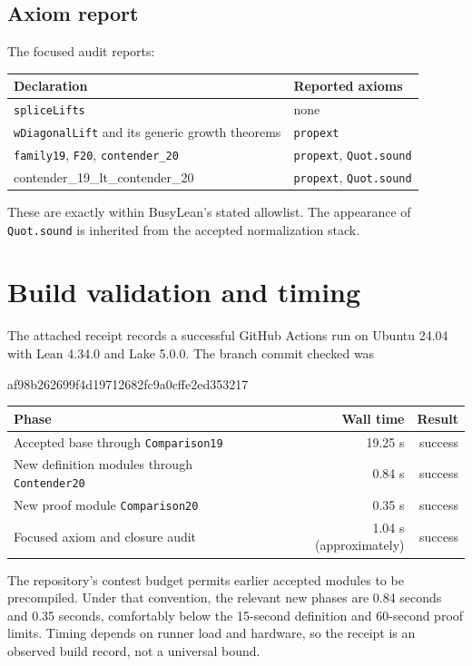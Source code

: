 \documentclass[11pt]{article}
\theoremstyle{definition}
\newcommand{\code}[1]{\texttt{#1}}
\begin{document}
\subsection{Axiom report}

The focused audit reports:
\begin{center}
\begin{tabularx}{0.93\textwidth}{@{}lX@{}}
\toprule
Declaration & Reported axioms \\
\midrule
\code{spliceLifts} & none \\
\code{wDiagonalLift} and its generic growth theorems & \code{propext} \\
\code{family19}, \code{F20}, \code{contender\_20} & \code{propext}, \code{Quot.sound} \\
contender\_19\_lt\_contender\_20 & \code{propext}, \code{Quot.sound} \\
\bottomrule
\end{tabularx}
\end{center}
These are exactly within BusyLean's stated allowlist.  The appearance of
\code{Quot.sound} is inherited from the accepted normalization stack.

\section{Build validation and timing}

The attached receipt records a successful GitHub Actions run on Ubuntu 24.04
with Lean 4.34.0 and Lake 5.0.0.  The branch commit checked was
\begin{center}
\small\ttfamily af98b262699f4d19712682fc9a0cffe2ed353217
\end{center}

\begin{center}
\begin{tabular}{@{}lrr@{}}
\toprule
Phase & Wall time & Result \\
\midrule
Accepted base through \code{Comparison19} & 19.25 s & success \\
New definition modules through \code{Contender20} & 0.84 s & success \\
New proof module \code{Comparison20} & 0.35 s & success \\
Focused axiom and closure audit & 1.04 s (approximately) & success \\
\bottomrule
\end{tabular}
\end{center}

The repository's contest budget permits earlier accepted modules to be
precompiled.  Under that convention, the relevant new phases are 0.84 seconds
and 0.35 seconds, comfortably below the 15-second definition and 60-second
proof limits.  Timing depends on runner load and hardware, so the receipt is an
observed build record, not a universal bound.
\end{document}
